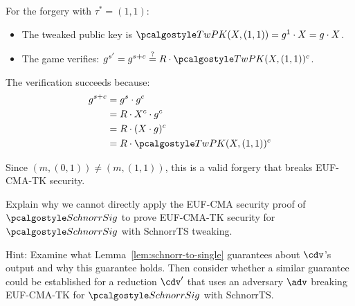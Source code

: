 \begin{mysolution}
  For the forgery with $\tau^* = (1, 1)$:
  \begin{itemize}
    \item The tweaked public key is $\algo{TwPK}(X, (1, 1)) = g^1 \cdot X = g \cdot X$.
    \item The game verifies: $g^{s'} = g^{s + c} \stackrel{?}{=} R \cdot \algo{TwPK}(X, (1, 1))^c$.
  \end{itemize}
  
  The verification succeeds because:
  \begin{align*}
    g^{s + c} &= g^s \cdot g^c \\
    &= R \cdot X^c \cdot g^c \\
    &= R \cdot (X \cdot g)^c \\
    &= R \cdot \algo{TwPK}(X, (1, 1))^c
  \end{align*}
  
  Since $(m, (0, 1)) \neq (m, (1, 1))$, this is a valid forgery that breaks EUF-CMA-TK security.
\end{mysolution}
\fi

\begin{exercise}
  Explain why we cannot directly apply the EUF-CMA security proof of $\algo{SchnorrSig}$ to prove EUF-CMA-TK security for $\algo{SchnorrSig}$ with SchnorrTS tweaking.
  
  Hint: Examine what Lemma~\ref{lem:schnorr-to-single} guarantees about $\cdv$'s output and why this guarantee holds. Then consider whether a similar guarantee could be established for a reduction $\cdv'$ that uses an adversary $\adv$ breaking EUF-CMA-TK for $\algo{SchnorrSig}$ with SchnorrTS.
\end{exercise}

